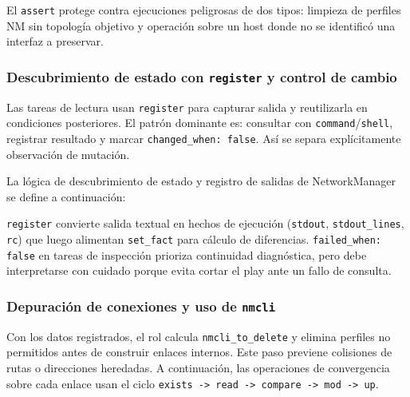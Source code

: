 El \texttt{assert} protege contra ejecuciones peligrosas de dos tipos: limpieza de perfiles NM sin topología objetivo y operación sobre un host donde no se identificó una interfaz a preservar.

\subsubsection{Descubrimiento de estado con \texttt{register} y control de cambio}
Las tareas de lectura usan \texttt{register} para capturar salida y reutilizarla en condiciones posteriores. El patrón dominante es: consultar con \texttt{command}/\texttt{shell}, registrar resultado y marcar \texttt{changed\_when: false}. Así se separa explícitamente observación de mutación.

La lógica de descubrimiento de estado y registro de salidas de NetworkManager se define a continuación:


\texttt{register} convierte salida textual en hechos de ejecución (\texttt{stdout}, \texttt{stdout\_lines}, \texttt{rc}) que luego alimentan \texttt{set\_fact} para cálculo de diferencias. \texttt{failed\_when: false} en tareas de inspección prioriza continuidad diagnóstica, pero debe interpretarse con cuidado porque evita cortar el play ante un fallo de consulta.

\subsubsection{Depuración de conexiones y uso de \texttt{nmcli}}
Con los datos registrados, el rol calcula \texttt{nmcli\_to\_delete} y elimina perfiles no permitidos antes de construir enlaces internos. Este paso previene colisiones de rutas o direcciones heredadas. A continuación, las operaciones de convergencia sobre cada enlace usan el ciclo \texttt{exists -> read -> compare -> mod -> up}.

